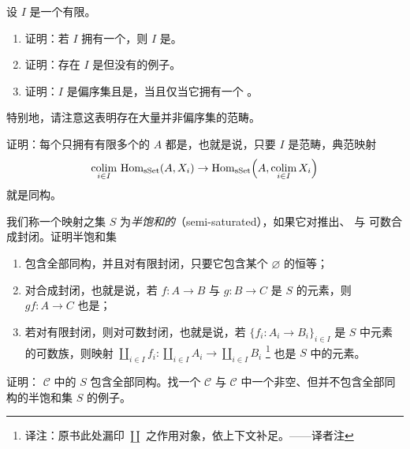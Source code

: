 \begin{exercise}\label{ex:finite-filtered-categories}
设 $I$ 是一个有限\trCategory{}。
\begin{enumerate}[label=(\arabic*)]
  \item 证明：若 $I$ 拥有一个\trTerminalObject{}，则 $I$ 是\trFiltered{}。
  \item 证明：存在 $I$ 是\trFiltered{}但没有\trTerminalObject{}的例子。
  \item 证明：$I$ 是偏序集且是\trFiltered{}，当且仅当它拥有一个%
        \trTerminalObject{}。
\end{enumerate}
特别地，请注意这表明存在大量并非偏序集的\trFiltered{}范畴。
\end{exercise}

\begin{exercise}\label{ex:finitely-presented-compact}
证明：每个只拥有有限多个\trNonDegenerate{}\trSimplex{}的\trSimplicialSet{} $A$
都是\emph{\trCompact{}}，也就是说，只要 $I$ 是\trFiltered{}范畴，典范映射
\[
\mathop{\mathrm{colim}}_{i \in I}\,
\mathrm{Hom}_{\mathrm{sSet}}(A, X_i)
\to
\mathrm{Hom}_{\mathrm{sSet}}\Bigl(A, \mathop{\mathrm{colim}}_{i \in I} X_i\Bigr)
\]
就是同构。
\end{exercise}

\begin{exercise}\label{ex:semi-saturated}
我们称一个映射之集 $S$ 为\emph{半饱和的}（semi-saturated），如果它对推出、%
\trRetract{}与
可数合成封闭。证明半饱和集
\begin{enumerate}[label=(\arabic*)]
  \item 包含全部同构，并且对有限\trCoproduct{}封闭，只要它包含某个\trInitialObject{}%
        $\varnothing$ 的恒等；
  \item 对合成封闭，也就是说，若 $f\colon A \to B$ 与 $g\colon B \to C$ 是 $S$
        的元素，则 $gf\colon A \to C$ 也是；
  \item 若对有限\trCoproduct{}封闭，则对可数\trCoproduct{}封闭，也就是说，若
        $\{f_i\colon A_i \to B_i\}_{i \in I}$ 是 $S$ 中元素的可数族，则映射
        $\coprod_{i \in I} f_i\colon \coprod_{i \in I} A_i \to \coprod_{i \in I} B_i$%
        \footnote{译注：原书此处漏印 $\coprod$ 之作用对象，依上下文补足。——译者注}
        也是 $S$ 中的元素。
\end{enumerate}
\end{exercise}

\begin{exercise}\label{ex:saturated-contains-isos}
证明：\trCategory{} $\mathcal{C}$ 中的\trSaturatedSet{} $S$ 包含全部同构。找一个\trCategory{}%
$\mathcal{C}$ 与 $\mathcal{C}$ 中一个非空、但并不包含全部同构的半饱和\trMorphism{}集
$S$ 的例子。
\end{exercise}

